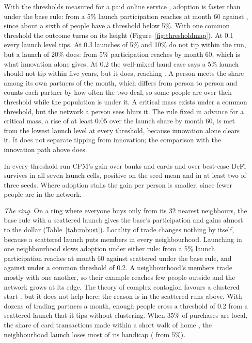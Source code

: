 With the thresholds measured for a paid online service \cite{karsaicascades}, adoption is faster than under the
base rule: from a 5\% launch participation reaches \RobustMeasuredPartFive{} at month 60 against
\RobustBasePartFive{}, since about a sixth of people have a threshold below 5\%. With one common threshold
\cite{watts} the outcome turns on its height (Figure~\ref{fig:thresholdmap}). At 0.1 every launch level tips. At
0.3 launches of 5\% and 10\% do not tip within the run, but a launch of 20\% does: from 5\% participation reaches
\RobustThresholdThirtyPartFive{} by month 60, which is what innovation alone gives. At 0.2 the well-mixed hand case says a 5\% launch should not tip within five years, but it
does, reaching \RobustThresholdTwentyPartFive{}. A person meets the share among its own partners of the month,
which differs from person to person and counts each partner by how often the two deal, so some people are over
their threshold while the population is under it. A critical mass exists under a common threshold, but the network
a person sees blurs it. The rule fixed in advance for a critical mass, a rise of at least 0.05 over the
launch share by month 60, is met from the lowest launch level at every threshold, because innovation alone clears
it. It does not separate tipping from innovation; the comparison with the innovation path above does.

In every threshold run CPM's gain over banks and cards and over best-case DeFi survives in all seven launch cells,
positive on the seed mean and in at least two of three seeds. Where adoption stalls the gain per person is smaller,
since fewer people are in the network.

\emph{The ring.} On a ring where everyone buys only from its 32 nearest neighbours, the base rule with a
scattered launch gives the base's participation and gains almost to the dollar (Table~\ref{tab:robust}). Locality
of trade changes nothing by itself, because a scattered launch puts members in every neighbourhood. Launching in
one neighbourhood slows adoption under either rule: from a 5\% launch participation reaches
\RobustRingNeighbourhoodPartFive{} at month 60 against \RobustRingPartFive{} scattered under the base rule, and
\RobustRingThresholdNeighbourhoodPartFive{} against \RobustRingThresholdPartFive{} under a common threshold of 0.2.
A neighbourhood's members trade mostly with one another, so their example reaches few people outside and the
network grows at its edge. The theory of complex contagion favours a clustered start \cite{centolamacy},
but it does not help here; the reason is in the scattered runs above. With dozens of trading partners a month,
enough people cross a threshold of 0.2 from a scattered launch that it tips without clustering. When 35\% of
purchases are local, the share of card transactions made within a short walk of home \cite{farrell}, the
neighbourhood launch loses most of its handicap (\RobustRingLocalThresholdNeighbourhoodPartFive{} from 5\%).

